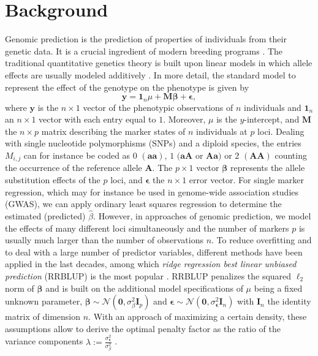 \documentclass{bmcart}
\newcommand{\M}{\mathbf{M}}
\newcommand{\0}{\mathbf{0}}
\begin{document}
\section*{Background}
Genomic prediction is the prediction of properties of individuals from their genetic data. It is a crucial ingredient of modern breeding programs \cite{meuwissen01,schaeffer06,habier07,hayes09a,hayes13}.
The traditional quantitative genetics theory is built upon linear models in which allele effects are usually modeled additively \cite{falconer96}.
In more detail, the standard model to represent the effect of the genotype on the phenotype is given by
\begin{equation} \label{eq:01}
	\mathbf{y}=\mathbf{1}_n \mu + \M \bm{\beta} + \bm{\epsilon},
\end{equation} 
where $\mathbf{y}$ is the $n \times 1$ vector of the phenotypic observations of $n$ individuals and $\mathbf{1}_n$ an $n \times 1$ vector with each entry equal to $1$.  Moreover,
$\mu$ is the $y$-intercept, and $\M$  the  $n \times p$ matrix describing the marker states of $n$ individuals at $p$ loci. Dealing with single nucleotide polymorphisms (SNPs) and a diploid species, the entries $M_{i,j}$ can for instance be coded as $0$ $(\mathbf{aa})$, $1$ $(\mathbf{aA}$ or $\mathbf{Aa})$ or $2$ $(\mathbf{AA})$ counting the occurrence of the reference allele $\mathbf{A}$. The $p \times 1$ vector $\bm{\beta}$ represents the allele substitution effects of the $p$ loci, and $\bm{\epsilon}$ the $n \times 1$ error vector. For single marker regression, which may for instance be used in genome-wide association studies (GWAS), we can apply ordinary least squares regression to determine the estimated (predicted) $\hat{\beta}$. 
However, in approaches of genomic prediction, we model the effects of many different loci simultaneously and the number of markers $p$ is usually much larger than the number of observations $n$. To reduce overfitting and to deal with a large number of predictor variables, different methods have been applied in the last decades, among which \emph{ridge regression best linear unbiased prediction} (RRBLUP) is the most popular \cite{schaeffer2004application}. RRBLUP penalizes the squared $\ell_2$ norm of $\bm{\beta}$ and is built on the additional model specifications of $\mu$ being a fixed unknown parameter, $\bm{\beta}\sim \mathcal{N}(\bm{0},\sigma_\beta^2 \mathbf{I}_p)$ and $\bm{\epsilon}\sim \mathcal{N}(\bm{0},\sigma_{\bm{\epsilon}}^2 \mathbf{I}_n)$ with $\mathbf{I}_n$ the identity matrix of dimension $n$.
With an approach of maximizing a certain density, these assumptions allow to derive the optimal penalty factor as the ratio of the variance components $\lambda:= \frac{\sigma_{\bm{\epsilon}}^2}{\sigma_\beta^2}$ \cite{henderson75,henderson76,henderson77}. %
\end{document}

